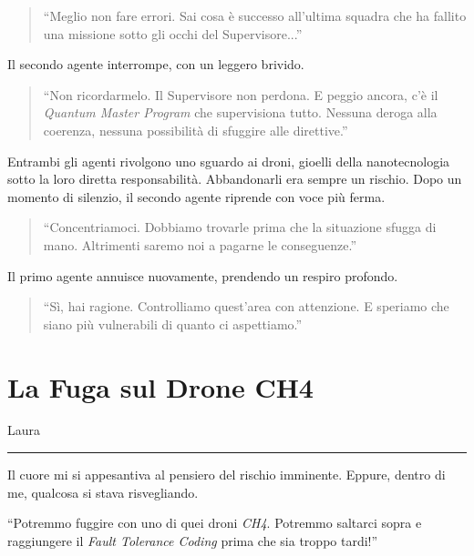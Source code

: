 \begin{quote}
\enquote{Meglio non fare errori. Sai cosa è successo all'ultima squadra che ha fallito una missione sotto gli occhi del Supervisore...}
\end{quote}

Il secondo agente interrompe, con un leggero brivido.

\begin{quote}
\enquote{Non ricordarmelo. Il Supervisore non perdona. E peggio ancora, c'è il \textit{Quantum Master Program} che supervisiona tutto. Nessuna deroga alla coerenza, nessuna possibilità di sfuggire alle direttive.}
\end{quote}

Entrambi gli agenti rivolgono uno sguardo ai droni, gioelli della nanotecnologia sotto la loro diretta responsabilità. Abbandonarli era sempre un rischio. Dopo un momento di silenzio, il secondo agente riprende con voce più ferma.

\begin{quote}
\enquote{Concentriamoci. Dobbiamo trovarle prima che la situazione sfugga di mano. Altrimenti saremo noi a pagarne le conseguenze.}
\end{quote}

Il primo agente annuisce nuovamente, prendendo un respiro profondo.

\begin{quote}
\enquote{Sì, hai ragione. Controlliamo quest'area con attenzione. E speriamo che siano più vulnerabili di quanto ci aspettiamo.}
\end{quote}

\section{La Fuga sul Drone CH4}
\vspace{1em}
\begin{center}Laura\end{center}
\hrule
\vspace{1em}

 Il cuore mi si appesantiva al pensiero del rischio imminente. Eppure, dentro di me, qualcosa si stava risvegliando.

\begin{dialogue}
 \enquote{Potremmo fuggire con uno di quei droni \textit{CH4}. Potremmo saltarci sopra e raggiungere il \textit{Fault Tolerance Coding} prima che sia troppo tardi!}
\end{dialogue}

